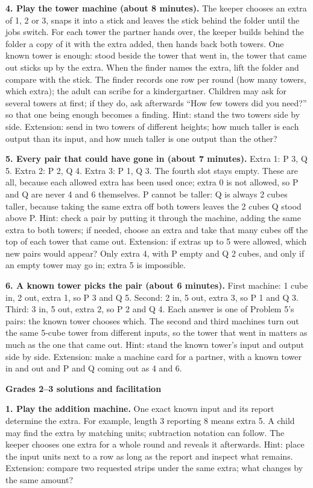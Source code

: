 \documentclass[letterpaper,11pt]{article}
\newcommand{\topic}[1]{\par\medskip\textbf{#1}\par}
\begin{document}
\textbf{4. Play the tower machine (about 8 minutes).} The keeper chooses an extra of 1, 2 or 3, snaps it into a stick and leaves the stick behind the folder until the jobs switch. For each tower the partner hands over, the keeper builds behind the folder a copy of it with the extra added, then hands back both towers. One known tower is enough: stood beside the tower that went in, the tower that came out sticks up by the extra. When the finder names the extra, lift the folder and compare with the stick. The finder records one row per round (how many towers, which extra); the adult can scribe for a kindergartner. Children may ask for several towers at first; if they do, ask afterwards ``How few towers did you need?'' so that one being enough becomes a finding. Hint: stand the two towers side by side. Extension: send in two towers of different heights; how much taller is each output than its input, and how much taller is one output than the other?

\textbf{5. Every pair that could have gone in (about 7 minutes).} Extra 1: P 3, Q 5. Extra 2: P 2, Q 4. Extra 3: P 1, Q 3. The fourth slot stays empty. These are all, because each allowed extra has been used once; extra 0 is not allowed, so P and Q are never 4 and 6 themselves. P cannot be taller: Q is always 2 cubes taller, because taking the same extra off both towers leaves the 2 cubes Q stood above P. Hint: check a pair by putting it through the machine, adding the same extra to both towers; if needed, choose an extra and take that many cubes off the top of each tower that came out. Extension: if extras up to 5 were allowed, which new pairs would appear? Only extra 4, with P empty and Q 2 cubes, and only if an empty tower may go in; extra 5 is impossible.

\textbf{6. A known tower picks the pair (about 6 minutes).} First machine: 1 cube in, 2 out, extra 1, so P 3 and Q 5. Second: 2 in, 5 out, extra 3, so P 1 and Q 3. Third: 3 in, 5 out, extra 2, so P 2 and Q 4. Each answer is one of Problem 5's pairs: the known tower chooses which. The second and third machines turn out the same 5-cube tower from different inputs, so the tower that went in matters as much as the one that came out. Hint: stand the known tower's input and output side by side. Extension: make a machine card for a partner, with a known tower in and out and P and Q coming out as 4 and 6.
\newpage
\topic{Grades 2--3 solutions and facilitation}
\textbf{1. Play the addition machine.} One exact known input and its report determine the extra. For example, length 3 reporting 8 means extra 5. A child may find the extra by matching units; subtraction notation can follow. The keeper chooses one extra for a whole round and reveals it afterwards. Hint: place the input units next to a row as long as the report and inspect what remains. Extension: compare two requested strips under the same extra; what changes by the same amount?
\end{document}
